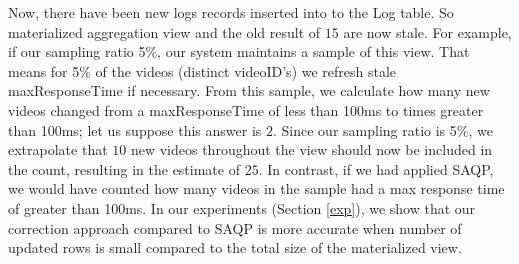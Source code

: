 Now, there have been new logs records inserted into to the Log table. 
So materialized aggregation view and the old result of $15$ are now stale.
For example, if our sampling ratio 5\%, our system maintains a sample of this view.
That means for 5\% of the videos (distinct videoID's) we refresh stale maxResponseTime if necessary.
From this sample, we calculate how many new videos changed from a maxResponseTime of less than 100ms to times greater than 100ms; let us suppose this answer is $2$.
Since our sampling ratio is 5\%, we extrapolate that $10$ new videos throughout the view should now be included in the count, resulting in the estimate of $25$.
In contrast, if we had applied SAQP, we would have counted how many videos in the sample had a max response time of greater than 100ms.
In our experiments (Section \ref{exp}), we show that our correction approach compared to SAQP is more accurate when number of updated rows is small compared to the total size of the materialized view.